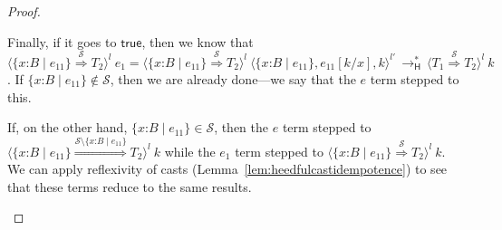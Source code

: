 \documentclass[9pt]{extarticle}
\newcommand{\ottnt}[1]{\mathit{#1}}
\begin{document}
{\begin{lemma}
\begin{proof}
{\begin{itemize}
Finally, if it goes to $ \mathsf{true} $, then we know that $ \langle   \{ \mathit{x} \mathord{:} \ottnt{B} \mathrel{\mid} \ottnt{e_{{\mathrm{11}}}} \}   \mathord{ \overset{ \mathcal{S} }{\Rightarrow} }  \ottnt{T_{{\mathrm{2}}}}  \rangle^{ \ottnt{l} } ~  \ottnt{e_{{\mathrm{1}}}}  =  \langle   \{ \mathit{x} \mathord{:} \ottnt{B} \mathrel{\mid} \ottnt{e_{{\mathrm{11}}}} \}   \mathord{ \overset{ \mathcal{S} }{\Rightarrow} }  \ottnt{T_{{\mathrm{2}}}}  \rangle^{ \ottnt{l} } ~   \langle   \{ \mathit{x} \mathord{:} \ottnt{B} \mathrel{\mid} \ottnt{e_{{\mathrm{11}}}} \}  ,   \ottnt{e_{{\mathrm{11}}}}  [  \ottnt{k} / \mathit{x}  ]  ,  \ottnt{k}  \rangle^{ \ottnt{l'} }   \,  \longrightarrow ^{*}_{  \mathsf{H}  }  \,  \langle  \ottnt{T_{{\mathrm{1}}}}  \mathord{ \overset{ \mathcal{S} }{\Rightarrow} }  \ottnt{T_{{\mathrm{2}}}}  \rangle^{ \ottnt{l} } ~  \ottnt{k} $.
If $  \{ \mathit{x} \mathord{:} \ottnt{B} \mathrel{\mid} \ottnt{e_{{\mathrm{11}}}} \}   \not\in  \mathcal{S} $, then we are already done---we say
      that the $\ottnt{e}$ term stepped to this.

      If, on the other hand, $  \{ \mathit{x} \mathord{:} \ottnt{B} \mathrel{\mid} \ottnt{e_{{\mathrm{11}}}} \}   \in  \mathcal{S} $, then the $\ottnt{e}$
      term stepped to $ \langle   \{ \mathit{x} \mathord{:} \ottnt{B} \mathrel{\mid} \ottnt{e_{{\mathrm{11}}}} \}   \mathord{ \overset{  \mathcal{S}  \setminus   \{ \mathit{x} \mathord{:} \ottnt{B} \mathrel{\mid} \ottnt{e_{{\mathrm{11}}}} \}   }{\Rightarrow} }  \ottnt{T_{{\mathrm{2}}}}  \rangle^{ \ottnt{l} } ~  \ottnt{k} $ while
      the $\ottnt{e_{{\mathrm{1}}}}$ term stepped to $ \langle   \{ \mathit{x} \mathord{:} \ottnt{B} \mathrel{\mid} \ottnt{e_{{\mathrm{11}}}} \}   \mathord{ \overset{ \mathcal{S} }{\Rightarrow} }  \ottnt{T_{{\mathrm{2}}}}  \rangle^{ \ottnt{l} } ~  \ottnt{k} $.
We can apply reflexivity of casts
      (Lemma~\ref{lem:heedfulcastidempotence}) to see that these terms
      reduce to the same results.
      

\end{itemize}}
\end{proof}
\end{lemma}}
\end{document}
